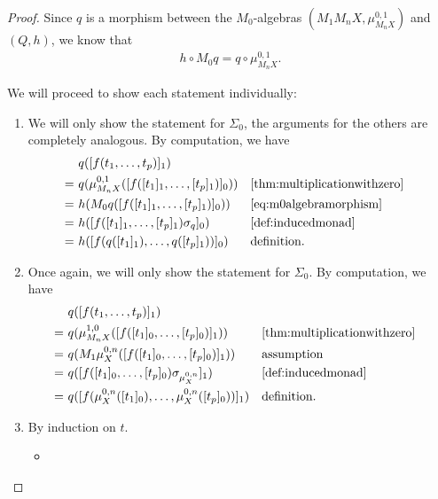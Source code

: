 \documentclass[a4paper,UKenglish,cleveref,thm-restate,numberwithinsect,final]{lipics-v2021}
\newcommand{\sigp}{\Sigma_0}
\theoremstyle{plain}
\numberwithin{equation}{section}
\newcommand{\+}[1]{\mathcal{#1}\xspace}
\theoremstyle{definition}
\begin{document}
\begin{proof}
    Since \(q\) is a morphism between the \(M_0\)-algebras \((M_1 M_n X, \mu^{0, 1}_{M_n X})\) and \((Q, h)\), we know that
    \begin{align}
        h \circ M_0 q = q \circ \mu^{0, 1}_{M_n X}. \label{eq:m0algebramorphism}
    \end{align}

    We will proceed to show each statement individually:
    \begin{enumerate}[wide]
        \item
            We will only show the statement for \(\sigp\), the arguments for the others are completely analogous.
            By computation, we have
            \begin{align*}
                &q([f(t_1, \ldots, t_p)]_1) \\
                =~&q(\mu^{0, 1}_{M_n X}([f([t_1]_1, \ldots, [t_p]_1)]_0)) && \text{\cref{thm:multiplicationwithzero}} \\
                =~&h(M_0 q([f([t_1]_1, \ldots, [t_p]_1)]_0)) && \text{\cref{eq:m0algebramorphism}} \\
                =~&h([f([t_1]_1, \ldots, [t_p]_1)\sigma_q]_0) && \text{\cref{def:inducedmonad}} \\
                =~&h([f(q([t_1]_1), \ldots, q([t_p]_1))]_0) && \text{definition}.
            \end{align*}
        \item
            Once again, we will only show the statement for \(\sigp\).
            By computation, we have
            \begin{align*}
                &q([f(t_1, \ldots, t_p)]_1) \\
                =~&q(\mu^{1, 0}_{M_n X}([f([t_1]_0, \ldots, [t_p]_0)]_1)) && \text{\cref{thm:multiplicationwithzero}} \\
                =~&q(M_1 \mu^{0, n}_X([f([t_1]_0, \ldots, [t_p]_0)]_1)) && \text{assumption} \\
                =~&q([f([t_1]_0, \ldots, [t_p]_0) \sigma_{\mu^{0, n}_X}]_1) && \text{\cref{def:inducedmonad}} \\
                =~&q([f(\mu^{0, n}_X([t_1]_0), \ldots, \mu^{0, n}_X([t_p]_0))]_1) && \text{definition}.
            \end{align*}
        \item
            By induction on \(t\).
            \begin{itemize}
                \item

\end{itemize}
\end{enumerate}
\end{proof}
\end{document}
